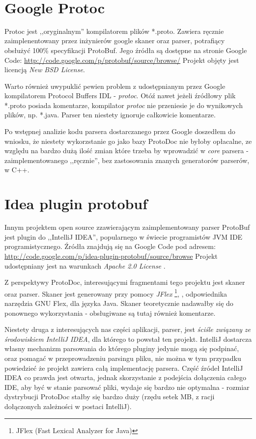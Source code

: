 \documentclass[pdflatex,11pt]{aghdpl}
\begin{document}
~\\\*

\section{Google Protoc}

Protoc jest ,,oryginalnym'' kompilatorem plików *.proto. Zawiera ręcznie zaimplenentowany przez inżynierów google skaner oraz parser,
potrafiący obsłużyć 100\% specyfikacji ProtoBuf. Jego źródła są dostępne na stronie Google Code: \href{http://code.google.com/p/protobuf/source/browse/}{http://code.google.com/p/protobuf/source/browse/}
Projekt objęty jest licencją \textit{New BSD License}\cite{BDSLicense}.

Warto również uwypuklić pewien problem z udostępnianym przez Google kompilatorem Protocol Buffers IDL - \textit{protoc}.
Otóź nawet jeżeli źródłowy plik *.proto posiada komentarze, kompilator \textit{protoc} nie przeniesie je do wynikowych plików, np. *.java.
Parser ten niestety ignoruje całkowicie komentarze. 

Po wstępnej analizie kodu parsera dostarczanego przez Google doszedłem do wniosku, 
że niestety wykorzstanie go jako bazy ProtoDoc nie byłoby opłacalne, ze względu na bardzo dużą ilość zmian które trzeba by wprowadzić w \textit{core} parsera
 - zaimplementowanego ,,ręcznie'', bez zastosowania znanych generatorów parserów, w C++.

\section{Idea plugin protobuf}

Innym projektem open source zzawierającym zaimplementowany parser ProtoBuf jest plugin do ,,IntelliJ IDEA'', popularnego w świecie programistów JVM 
IDE programistycznego. Źródła znajdują się na Google Code pod adresem: \href{http://code.google.com/p/idea-plugin-protobuf/source/browse}{http://code.google.com/p/idea-plugin-protobuf/source/browse}
Projekt udostępniany jest na warunkach \textit{Apache 2.0 License} \cite{ApacheLicense}.

Z perspektywy ProtoDoc, interesującymi fragmentami tego projektu jest skaner oraz parser. 
Skaner jest generowany przy pomocy \textit{JFlex} \footnote{JFlex (Fast Lexical Analyzer for Java)},
, odpowiednika narzędzia GNU Flex, dla języka Java. Skaner teoretycznie nadawałby się do ponownego wykorzystania - obsługiwane są tutaj również komentarze.

Niestety druga z interesujących nas części aplikacji, parser, jest \textit{ściśle związany ze środowiskiem IntelliJ IDEA}, dla którego to powstał ten projekt.
IntelliJ dostarcza własny mechanizm parsowania do którego pluginy jedynie mogą się podpinać, oraz pomagać w przeprowadzeniu parsingu pliku, nie można w tym przypadku
powiedzieć że projekt zawiera całą implementację parsera. Część źródeł IntelliJ IDEA co prawda jest otwarta, jednak skorzystanie z podejścia dołączenia całego IDE,
aby być w stanie parsować pliki, wydaje się bardzo nie optymalna - rozmiar dystrybucji ProtoDoc stałby się bardzo duży (rzędu setek MB, z racji dołączonych 
zależności w postaci IntelliJ).
\end{document}
